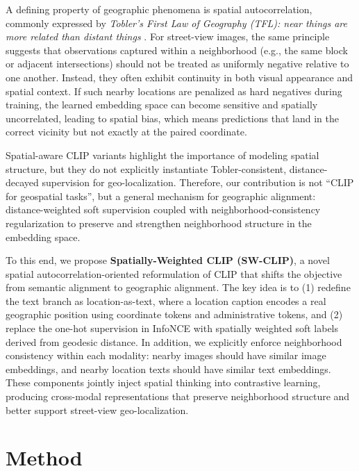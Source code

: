 \documentclass{isprs}
\begin{document}
A defining property of geographic phenomena is spatial autocorrelation, commonly expressed by \textit{Tobler’s First Law of Geography (TFL): near things are more related than distant things} \cite{tobler1970computer}. For street-view images, the same principle suggests that observations captured within a neighborhood (e.g., the same block or adjacent intersections) should not be treated as uniformly negative relative to one another. Instead, they often exhibit continuity in both visual appearance and spatial context. If such nearby locations are penalized as hard negatives during training, the learned embedding space can become sensitive and spatially uncorrelated, leading to spatial bias, which means predictions that land in the correct vicinity but not exactly at the paired coordinate.

Spatial-aware CLIP \cite{han2025towards,suo2023text,wang2025spatialclip} variants highlight the importance of modeling spatial structure, but they do not explicitly instantiate Tobler-consistent, distance-decayed supervision for geo-localization. Therefore, our contribution is not “CLIP for geospatial tasks”, but a general mechanism for geographic alignment: distance-weighted soft supervision coupled with neighborhood-consistency regularization to preserve and strengthen neighborhood structure in the embedding space.

To this end, we propose \textbf{Spatially-Weighted CLIP (SW-CLIP)}, a novel spatial autocorrelation-oriented reformulation of CLIP that shifts the objective from semantic alignment to geographic alignment. The key idea is to (1) redefine the text branch as location-as-text, where a location caption encodes a real geographic position using coordinate tokens and administrative tokens, and (2) replace the one-hot supervision in InfoNCE with spatially weighted soft labels derived from geodesic distance. In addition, we explicitly enforce neighborhood consistency within each modality: nearby images should have similar image embeddings, and nearby location texts should have similar text embeddings. These components jointly inject spatial thinking into contrastive learning, producing cross-modal representations that preserve neighborhood structure and better support street-view geo-localization.

\section{Method}\label{sec:method}
\end{document}
